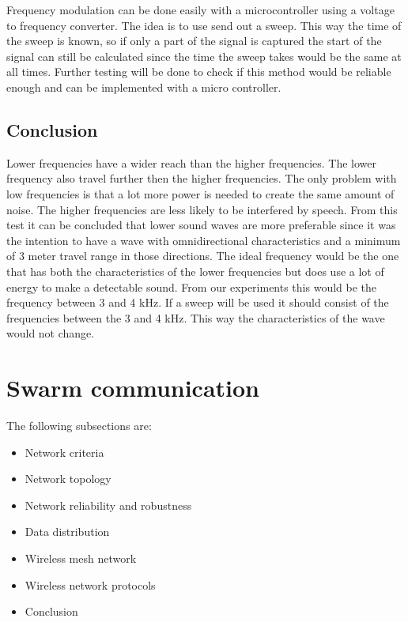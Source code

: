 \documentclass[10pt,a4paper]{article}
\begin{document}
Frequency modulation can be done easily with a microcontroller using a voltage to frequency converter. The idea is to use send out a sweep. This way the time of the sweep is known, so if only a part of the signal is captured the start of the signal can still be calculated since the time the sweep takes would be the same at all times. Further testing will be done to check if this method would be reliable enough and can be implemented with a micro controller.


\subsection{Conclusion}

Lower frequencies have a wider reach than the higher frequencies. The lower frequency also travel further then the higher frequencies. The only problem with low frequencies is that a lot more power is needed to create the same amount of noise. The higher frequencies are less likely to be interfered by speech. From this test it can be concluded that lower sound waves are more preferable since it was the intention to have a wave with omnidirectional characteristics and a minimum of 3 meter travel range in those directions. The ideal frequency would be the one that has both the characteristics of the lower frequencies but does use a lot of energy to make a detectable sound. From our experiments this would be the frequency between 3 and 4 kHz. If a sweep will be used it should consist of the frequencies between the 3 and 4 kHz. This way the characteristics of the wave would not change. 


\newpage
\section{Swarm communication}

The following subsections are:
\begin{itemize}
\setlength\itemsep{0em}
    \item Network criteria
    \item Network topology
    \item Network reliability and robustness
    \item Data distribution
    \item Wireless mesh network
    \item Wireless network protocols
    \item Conclusion
\end{itemize}
\end{document}
